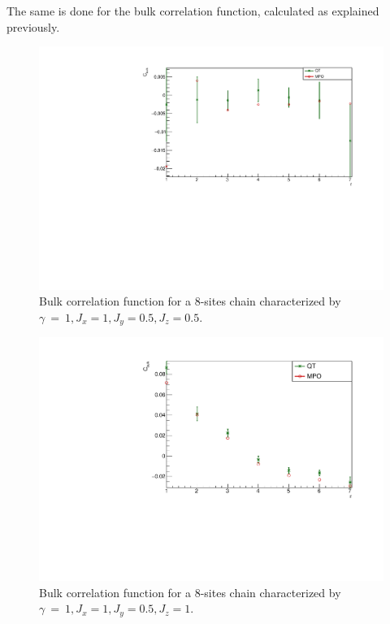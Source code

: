 The same is done for the bulk correlation function, calculated as explained previously.

\begin{figure}[H]
    \centering
    \includegraphics[scale=0.7]{Figures/8sites/CorrFuncBulkCONN_8sJ10505.pdf}
    \caption{Bulk correlation function for a 8-sites chain characterized by $\gamma~=~1, J_x=1, J_y=0.5, J_z=0.5$.}
    \label{fig:my_label}
\end{figure}

\begin{figure}[H]
    \centering
    \includegraphics[scale=0.7]{Figures/8sites/CorrFuncBulkCONN_8sJ1051.pdf}
    \caption{Bulk correlation function for a 8-sites chain characterized by $\gamma~=~1, J_x=1, J_y=0.5, J_z=1$.}
    \label{fig:my_label}
\end{figure}

